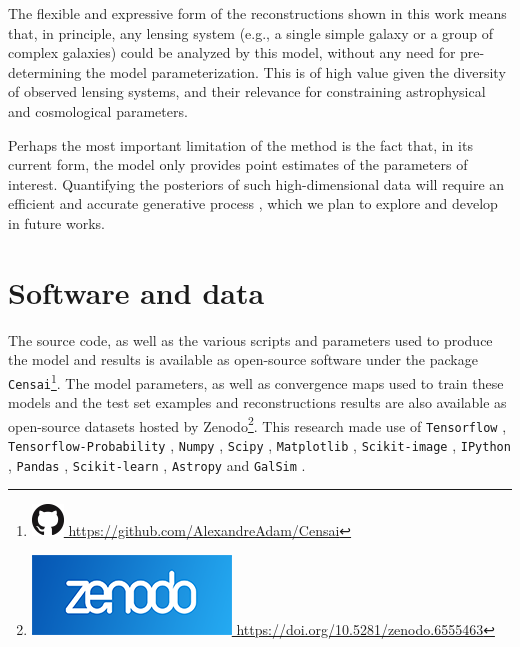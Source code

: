The flexible and expressive form of the reconstructions shown in this work means that, in principle, any lensing system (e.g., a single simple galaxy or a group of complex galaxies) could be analyzed by this model, without any need for pre-determining the model parameterization. This is of high value given the diversity of observed lensing systems, and their relevance for constraining astrophysical and cosmological parameters. 

Perhaps the most important limitation of the method is the fact that, in its current form, the model only provides point estimates of the parameters of interest. Quantifying the posteriors of such high-dimensional data will require an efficient and accurate generative process \citep[e.g., see ][]{Adam:22a}, which we plan to explore and develop in future works.

\section*{Software and data}
The source code, as well as the various scripts and parameters used to 
produce the model and results is available as open-source software 
under the package \texttt{Censai}\footnote{
\href{https://github.com/AlexandreAdam/Censai}{
\includegraphics[scale=0.25]{figures/GitHub-Mark-32px.png}
https://github.com/AlexandreAdam/Censai}}. 
The model parameters, as well as convergence maps used to train 
these models and the test set examples and reconstructions results are also available as open-source datasets hosted by Zenodo\footnote{\href{https://doi.org/10.5281/zenodo.6555463}
{\includegraphics[scale=0.1]{figures/zenodo}
https://doi.org/10.5281/zenodo.6555463}}. This research made use of \texttt{Tensorflow} \citep{tensorflow}, 
\texttt{Tensorflow-Probability} \citep{tensorflow-probability}, 
\texttt{Numpy} \citep{numpy}, 
\texttt{Scipy} \citep{scipy}, 
\texttt{Matplotlib} \citep{matplotlib}, 
\texttt{Scikit-image} \citep{scikit-image}, 
\texttt{IPython} \citep{ipython}, 
\texttt{Pandas} \citep{pandas1,pandas2}, 
\texttt{Scikit-learn} \citep{scikit-learn}, 
\texttt{Astropy} \citep{astropy:2013,astropy:2018} 
and \texttt{GalSim} \citep{galsim}.

